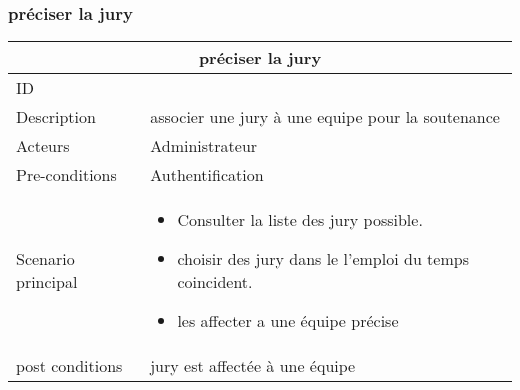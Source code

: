 \documentclass[11pt,fleqn]{book} %
\begin{document}
\subsubsection{préciser la jury}
\begin{center}
\begin{tabularx}{1\textwidth} { | p{4cm} | >{\raggedright\arraybackslash}X |  }
  \hline
  \multicolumn{2}{|c|}{préciser la jury} \\
 \hline
 ID & 3  \\
 \hline
 Description  & associer une jury à une equipe pour la soutenance   \\
  \hline
 Acteurs  & Administrateur   \\
  \hline
 Pre-conditions  & Authentification\\
 \hline
 Scenario principal  &  
 \begin{itemize}
     \item  Consulter la liste des jury possible.
     \item choisir des jury dans le l’emploi du temps coincident.
     \item les affecter a une équipe précise

 \end{itemize}\\
  \hline
 post conditions  & jury est affectée à une équipe \\
  \hline
\end{tabularx}
\label{tbl:nicetablelesstable}
\end{center}
\end{document}
